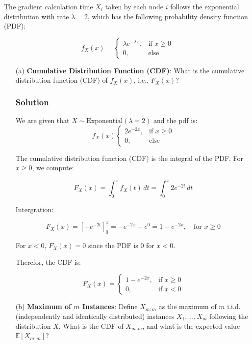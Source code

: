 \documentclass{article}
\begin{document}
The gradient calculation time $X_i$ taken by each node $i$ follows the exponential distribution with rate $\lambda = 2$, which has the following probability density function (PDF):


\[
f_X(x) = 
\begin{cases} 
\lambda e^{-\lambda x}, & \text{if } x \geq 0 \\
0, & \text{else}
\end{cases}
\]



\begin{enumerate}
    \item[(a)] \textbf{Cumulative Distribution Function (CDF)}:
    What is the cumulative distribution function (CDF) of $f_X(x)$, i.e., $F_X(x)$?
    \subsubsection*{Solution}
    We are given that \(X \sim \text{Exponential}(\lambda = 2)\) and the pdf is:
    \[
    f_X(x)
    \begin{cases}
        2 e^{-2 x}, & \text{if } x \geq 0 \\
        0, & \text{else}
    \end{cases}
    \]

    The cumulative distribution function (CDF) is the integral of the PDF. For \(x \geq 0\), we compute:

    \[
    F_X(x) = \int_{0}^{x} f_X(t) \, dt = \int_{0}^{x} 2 e^{-2t} \, dt
    \]

    Intergration:

    \[
    F_X(x) = \left[ -e^{-2t} \right]_{0}^{x} = -e^{-2x} + e^{0} = 1 - e^{-2x}, \quad \text{for } x \geq 0
    \]

    For \(x < 0\), \(F_X(x) = 0\) since the PDF is 0 for \(x < 0\).

    Therefor, the CDF is:

    \[
    F_X(x) =
    \begin{cases}
    1 - e^{-2x}, & \text{if } x \geq 0 \\
    0, & \text{if } x < 0
    \end{cases}
    \]

    \item[(b)] \textbf{Maximum of $m$ Instances}:
    Define $X_{m:m}$ as the maximum of $m$ i.i.d. (independently and identically distributed) instances $X_1, \dots, X_m$ following the distribution $X$. What is the CDF of $X_{m:m}$, and what is the expected value $\mathbb{E}[X_{m:m}]$?

\end{enumerate}
\end{document}
